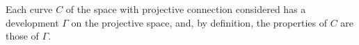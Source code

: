 Each curve $C$ of the space with projective connection considered  has a development $\Gamma$ on the projective space, and, by definition, the properties of $C$ are those of $\Gamma$.





























































































